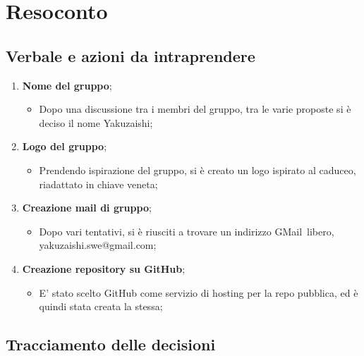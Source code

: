 \section{Resoconto}
\subsection{Verbale e azioni da intraprendere}

\begin{enumerate}
	\item \textbf{Nome del gruppo};
	\begin{itemize}
		\item Dopo una discussione tra i membri del gruppo, tra le varie proposte si è deciso il nome Yakuzaishi;
	\end{itemize}
	\item \textbf{Logo del gruppo};
	\begin{itemize}
		\item Prendendo ispirazione del gruppo, si è creato un logo ispirato al caduceo\glo, riadattato in chiave veneta;
	\end{itemize}
	\item \textbf{Creazione mail di gruppo};
	\begin{itemize}
		\item Dopo vari tentativi, si è riusciti a trovare un indirizzo GMail\glo\ libero, yakuzaishi.swe@gmail.com;
	\end{itemize}
	\item \textbf{Creazione repository su GitHub};
	\begin{itemize}
		\item E' stato scelto GitHub come servizio di hosting per la repo pubblica, ed è quindi stata creata la stessa;
	\end{itemize}

\end{enumerate}

\pagebreak

\subsection{Tracciamento delle decisioni}

